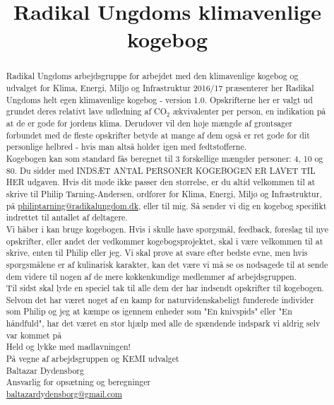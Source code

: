 \documentclass[11pt, a4paper]{article}
\newcommand{\coo}{CO$_2$ }
\begin{document}






\title{Radikal Ungdoms klimavenlige kogebog}
\author{}
\maketitle

\begin{abstract}
\noindent 	Radikal Ungdoms arbejdsgruppe for arbejdet med den klimavenlige kogebog og udvalget for Klima, Energi, Miljø og Infrastruktur 2016/17 præsenterer her Radikal Ungdoms helt egen klimavenlige kogebog - version 1.0. Opskrifterne her er valgt ud grundet deres relativt lave udledning af \coo ækvivalenter per person, en indikation på at de er gode for jordens klima. Derudover vil den høje mængde af grøntsager forbundet med de fleste opskrifter betyde at mange af dem også er ret gode for dit personlige helbred - hvis man altså holder igen med fedtstofferne.\\
	
\noindent	Kogebogen kan som standard fås beregnet til 3 forskellige mængder personer: 4, 10 og 80. Du sidder med INDSÆT ANTAL PERSONER KOGEBOGEN ER LAVET TIL HER udgaven. Hvis dit møde ikke passer den størrelse, er du altid velkommen til at skrive til Philip Tarning-Andersen, ordfører for Klima, Energi, Miljø og Infrastruktur, på \href{mailto:philiptarning@radikalungdom.dk}{philiptarning@radikalungdom.dk}, eller til mig. Så sender vi dig en kogebog specifikt indrettet til antallet af deltagere.\\
	
\noindent	Vi håber i kan bruge kogebogen. Hvis i skulle have spørgsmål, feedback, foreslag til nye opskrifter, eller andet der vedkommer kogebogsprojektet, skal i være velkommen til at skrive, enten til Philip eller jeg. Vi skal prøve at svare efter bedste evne, men hvis spørgsmålene er af kulinarisk karakter, kan det være vi må se os nødsagede til at sende dem videre til nogen af de mere køkkenkundige medlemmer af arbejdsgruppen.\\

\noindent Til sidst skal lyde en speciel tak til alle dem der har indsendt opskrifter til kogebogen. Selvom det har været noget af en kamp for naturvidenskabeligt funderede individer som Philip og jeg at kæmpe os igennem enheder som "En knivspids" eller "En håndfuld", har det været en stor hjælp med alle de spændende indspark vi aldrig selv var kommet på\\
	
\noindent	Held og lykke med madlavningen!\\
 På vegne af arbejdsgruppen og KEMI udvalget\\
	Baltazar Dydensborg\\
	Ansvarlig for opsætning og beregninger\\
	\href{mailto:baltazardydensborg@gmail.com}{baltazardydensborg@gmail.com}
\end{abstract}
\newpage
\tableofcontents

\vspace{5em}
\newpage


	

	
\end{document}
